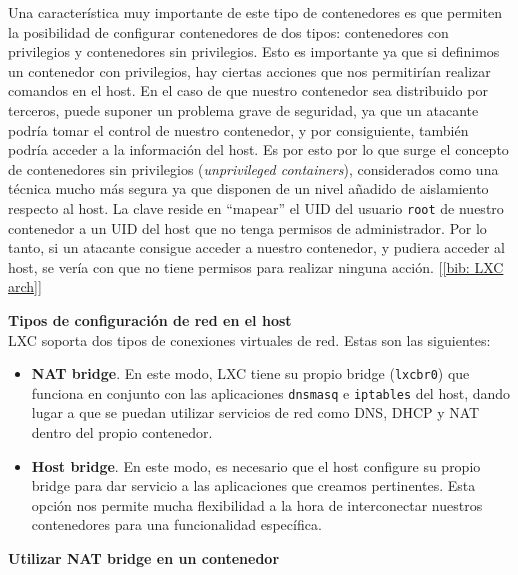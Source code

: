 \documentclass[a4paper, oneside, 12pt]{book}
\begin{document}
	\noindent Una característica muy importante de este tipo de contenedores es que permiten la posibilidad de configurar contenedores de dos tipos: contenedores con privilegios y contenedores sin privilegios. Esto es importante ya que si definimos un contenedor con privilegios, hay ciertas acciones que nos permitirían realizar comandos en el host. En el caso de que nuestro contenedor sea distribuido por terceros, puede suponer un problema grave de seguridad, ya que un atacante podría tomar el control de nuestro contenedor, y por consiguiente, también podría acceder a la información del host. Es por esto por lo que surge el concepto de contenedores sin privilegios (\textit{unprivileged containers}), considerados como una técnica mucho más segura ya que disponen de un nivel añadido de aislamiento respecto al host. La clave reside en ``mapear'' el UID del usuario \texttt{root} de nuestro contenedor a un UID del host que no tenga permisos de administrador. Por lo tanto, si un atacante consigue acceder a nuestro contenedor, y pudiera acceder al host, se vería con que no tiene permisos para realizar ninguna acción. [\ref{bib: LXC arch}]
	
	\pagebreak
	
	\noindent \textbf{\large Tipos de configuración de red en el host}\\
	
	\noindent LXC soporta dos tipos de conexiones virtuales de red. Estas son las siguientes: 
	\begin{itemize}
		\item \textbf{NAT bridge}. En este modo, LXC tiene su propio bridge (\texttt{lxcbr0}) que funciona en conjunto con las aplicaciones \texttt{dnsmasq} e \texttt{iptables} del host, dando lugar a que se puedan utilizar servicios de red como DNS, DHCP y NAT dentro del propio contenedor.
		\item \textbf{Host bridge}. En este modo, es necesario que el host configure su propio bridge para dar servicio a las aplicaciones que creamos pertinentes. Esta opción nos permite mucha flexibilidad a la hora de interconectar nuestros contenedores para una funcionalidad específica.
	\end{itemize}


	\vspace{20px}

	\noindent \textbf{\large Utilizar NAT bridge en un contenedor}\\
\end{document}
